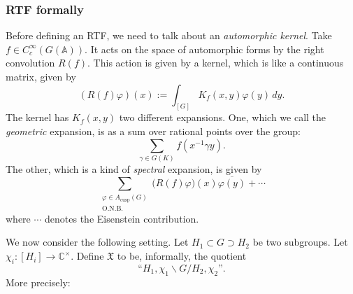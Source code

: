 \documentclass[reqno]{amsart} 
\numberwithin{theorem}{section}
\numberwithin{equation}{section}
\numberwithin{exercise}{section}
\begin{document}
\subsubsection{RTF formally}\label{sec:cq6thp1yjb}

Before defining an RTF, we need to talk about an \emph{automorphic kernel}.  Take $f \in C_c^\infty(G(\mathbb{A}))$.  It acts on the space of automorphic forms by the right convolution $R(f)$.  This action is given by a kernel, which is like a continuous matrix, given by
\begin{equation*}
  \left( R(f) \varphi \right)(x) := \int_{[G]}
  K_f(x, y) \varphi(y) \, d y.
\end{equation*}
The kernel has $K_f(x, y)$ two different expansions.  One, which we call the \emph{geometric} expansion, is as a sum over rational points over the group:
\begin{equation*}
  \sum_{\gamma \in G(K)}
  f(x^{-1} \gamma y).
\end{equation*}
The other, which is a kind of \emph{spectral} expansion, is given by
\begin{equation*}
  \sum_{
    \substack{
      \varphi \in A_{\mathrm{cusp}}(G)  \\
      \text{O.N.B.}      
    }
  }
  \bigl( R(f) \varphi \bigr)(x) \overline{\varphi(y)}
  + \dotsb 
\end{equation*}
where $\dotsb$ denotes the Eisenstein contribution.

We now consider the following setting.  Let $H_1 \subset G \supset H_2$ be two subgroups.  Let $\chi_i :[H_i] \rightarrow \mathbb{C}^\times$.  Define $\mathfrak{X}$ to be, informally, the quotient
\begin{equation*}
  \text{``}H_1, \chi_1 \backslash G / H_2, \chi_2\text{''}.
\end{equation*}
More precisely:
\end{document}
